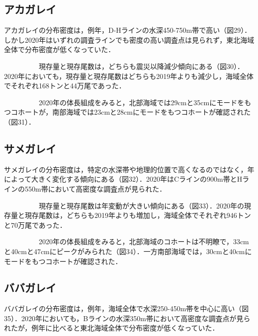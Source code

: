 \documentclass[11pt]{article} %
\begin{document}
\begin{linenumbers}
\subsection{アカガレイ}
アカガレイの分布密度は，例年，D-Hラインの水深450-750m帯で高い（図29）．しかし2020年はいずれの調査ラインでも密度の高い調査点は見られず，東北海域全体で分布密度が低くなっていた．

\ \ \ \ \ \ \ \ \ \ 
現存量と現存尾数は，どちらも震災以降減少傾向にある（図30）．2020年においても，現存量と現存尾数はどちらも2019年よりも減少し，海域全体でそれぞれ168トンと44万尾であった．

\ \ \ \ \ \ \ \ \ \ 
2020年の体長組成をみると，北部海域では29cmと35cmにモードをもつコホートが，南部海域では23cmと28cmにモードをもつコホートが確認された（図31）．


\subsection{サメガレイ}
サメガレイの分布密度は，特定の水深帯や地理的位置で高くなるのではなく，年によって大きく変化する傾向にある（図32）．2020年はCラインの900m帯とHラインの550m帯において高密度な調査点が見られた．

\ \ \ \ \ \ \ \ \ \ 
現存量と現存尾数は年変動が大きい傾向にある（図33）．2020年の現存量と現存尾数は，どちらも2019年よりも増加し，海域全体でそれぞれ946トンと70万尾であった．

\ \ \ \ \ \ \ \ \ \ 
2020年の体長組成をみると，北部海域のコホートは不明瞭で，33cmと40cmと47cmにピークがみられた（図34）．一方南部海域では，30cmと40cmにモードをもつコホートが確認された．


\subsection{ババガレイ}
ババガレイの分布密度は，例年，海域全体で水深250-450m帯を中心に高い（図35）．2020年においても，Bラインの水深350m帯において高密度な調査点が見られたが，例年に比べると東北海域全体で分布密度が低くなっていた．


\end{linenumbers}
\end{document}
